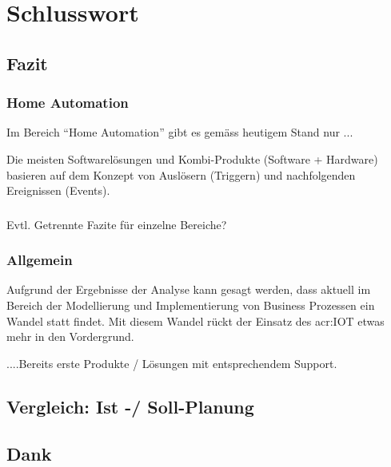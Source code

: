 
\chapter{Schlusswort} \label{chap:Finish}

\section{Fazit}
\subsection{Home Automation}
Im Bereich "`Home Automation"' gibt es gemäss heutigem Stand nur ...

Die meisten Softwarelösungen und Kombi-Produkte (Software + Hardware) basieren auf dem Konzept von Auslösern (Triggern) und nachfolgenden Ereignissen (Events).

\subsection{}
Evtl. Getrennte Fazite für einzelne Bereiche?


\subsection{Allgemein}
Aufgrund der Ergebnisse der Analyse kann gesagt werden, dass aktuell im Bereich der Modellierung und Implementierung von Business Prozessen ein Wandel statt findet. Mit diesem Wandel rückt der Einsatz des \gls{acr:IOT} etwas mehr in den Vordergrund. 

....Bereits erste Produkte / Lösungen mit entsprechendem Support.



\section{Vergleich: Ist -/ Soll-Planung}




\section{Dank}
